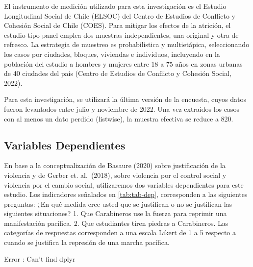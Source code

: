\documentclass[12pt,twoside]{templates/facsothesis}
\begin{document}
El instrumento de medición utilizado para esta investigación es el Estudio Longitudinal Social de Chile (ELSOC) del Centro de Estudios de Conflicto y Cohesión Social de Chile (COES). Para mitigar los efectos de la atrición, el estudio tipo panel emplea dos muestras independientes, una original y otra de refresco. La estrategia de muestreo es probabilística y multietápica, seleccionando los casos por ciudades, bloques, viviendas e individuos, incluyendo en la población del estudio a hombres y mujeres entre 18 a 75 años en zonas urbanas de 40 ciudades del país (Centro de Estudios de Conflicto y Cohesión Social, 2022).

Para esta investigación, se utilizará la última versión de la encuesta, cuyos datos fueron levantados entre julio y noviembre de 2022. Una vez extraídos los casos con al menos un dato perdido (listwise), la muestra efectiva se reduce a 820.

\hypertarget{variables-dependientes}{%
\subsection{Variables Dependientes}\label{variables-dependientes}}

En base a la conceptualización de Basaure (2020) sobre justificación de la violencia y de Gerber et. al.~(2018), sobre violencia por el control social y violencia por el cambio social, utilizaremos dos variables dependientes para este estudio. Los indicadores señalados en \ref{tab:tab-dep}, corresponden a las siguientes preguntas: ¿En qué medida cree usted que se justifican o no se justifican las siguientes situaciones? 1. Que Carabineros use la fuerza para reprimir una manifestación pacífica. 2. Que estudiantes tiren piedras a Carabineros. Las categorías de respuestas corresponden a una escala Likert de 1 a 5 respecto a cuando se justifica la represión de una marcha pacífica.

Error : Can't find dplyr
\end{document}
